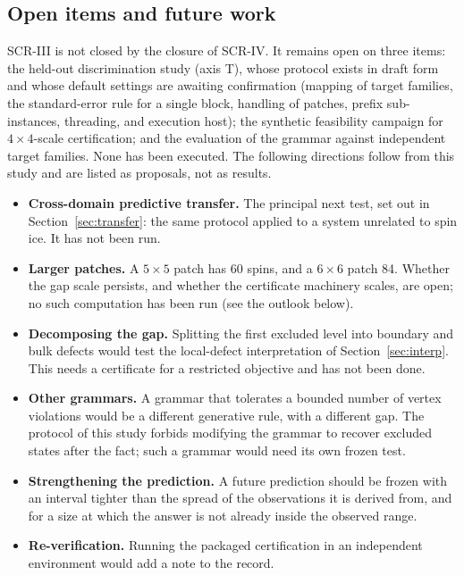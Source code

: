 \documentclass[11pt,a4paper]{article}
\theoremstyle{plain}
\theoremstyle{definition}
\theoremstyle{remark}
\begin{document}
\subsection{Open items and future work}
SCR-III is not closed by the closure of SCR-IV. It remains open on three items: the held-out discrimination study (axis T), whose protocol exists in draft form and whose default settings are awaiting confirmation (mapping of target families, the standard-error rule for a single block, handling of patches, prefix sub-instances, threading, and execution host); the synthetic feasibility campaign for $4\times4$-scale certification; and the evaluation of the grammar against independent target families. None has been executed. The following directions follow from this study and are listed as proposals, not as results.
\begin{itemize}
\item \textbf{Cross-domain predictive transfer.} The principal next test, set out in Section~\ref{sec:transfer}: the same protocol applied to a system unrelated to spin ice. It has not been run.
\item \textbf{Larger patches.} A $5\times5$ patch has 60 spins, and a $6\times6$ patch 84. Whether the gap scale persists, and whether the certificate machinery scales, are open; no such computation has been run (see the outlook below).
\item \textbf{Decomposing the gap.} Splitting the first excluded level into boundary and bulk defects would test the local-defect interpretation of Section~\ref{sec:interp}. This needs a certificate for a restricted objective and has not been done.
\item \textbf{Other grammars.} A grammar that tolerates a bounded number of vertex violations would be a different generative rule, with a different gap. The protocol of this study forbids modifying the grammar to recover excluded states after the fact; such a grammar would need its own frozen test.
\item \textbf{Strengthening the prediction.} A future prediction should be frozen with an interval tighter than the spread of the observations it is derived from, and for a size at which the answer is not already inside the observed range.
\item \textbf{Re-verification.} Running the packaged certification in an independent environment would add a note to the record.
\end{itemize}
\end{document}
